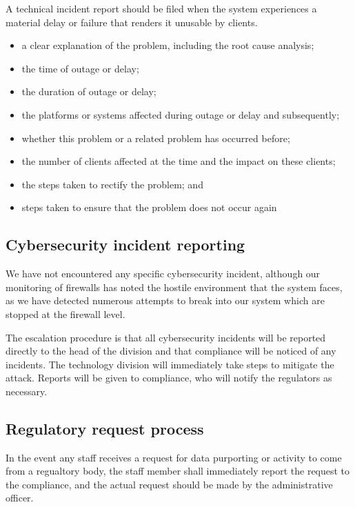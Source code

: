 A technical incident report should be filed when the system
experiences a material delay or failure that renders it unusable by
clients.

\begin{itemize}
\item a clear explanation of the problem, including the root cause analysis;
\item the time of outage or delay;
\item the duration of outage or delay;
\item the platforms or systems affected during outage or delay and subsequently;
\item whether this problem or a related problem has occurred before;
\item the number of clients affected at the time and the impact on these clients;
\item the steps taken to rectify the problem; and
\item steps taken to ensure that the problem does not occur again
\end{itemize}


\subsection{Cybersecurity incident reporting}

We have not encountered any specific cybersecurity incident, although
our monitoring of firewalls has noted the hostile environment that
the system faces, as we have detected numerous attempts to break into our
system which are stopped at the firewall level.

The escalation procedure is that all cybersecurity incidents will be
reported directly to the head of the division and that compliance will
be noticed of any incidents.  The technology division will immediately
take steps to mitigate the attack.  Reports will be given to
compliance, who will notify the regulators as necessary.

\subsection{Regulatory request process}
\label{label:regrequest}
In the event any staff receives a request for data purporting or
activity to come from a regualtory body, the staff member shall
immediately report the request to the compliance, and the actual
request should be made by the administrative officer.

